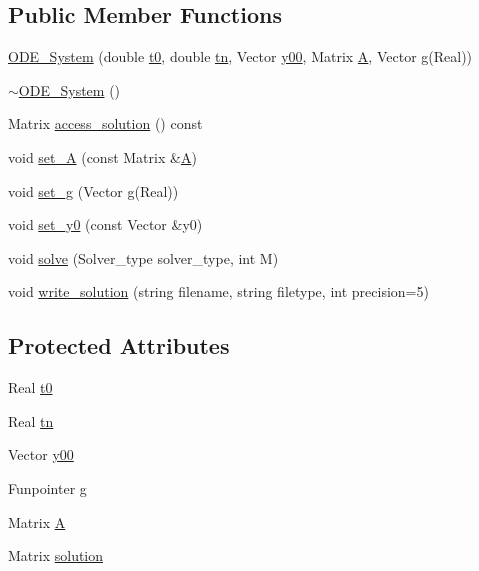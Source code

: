 \subsection*{Public Member Functions}
\begin{DoxyCompactItemize}
\item 
\mbox{\hyperlink{class_o_d_e___system_a38bd032b6faa0acc252c8c6c14a734b6}{O\+D\+E\+\_\+\+System}} (double \mbox{\hyperlink{class_o_d_e___system_a1947b357608babc98c5e79d645e24c3c}{t0}}, double \mbox{\hyperlink{class_o_d_e___system_a5c5a0dd9f04dfb8d8a84d49b741773af}{tn}}, Vector \mbox{\hyperlink{class_o_d_e___system_a1379137a4480e5861fd1911bc061f908}{y00}}, Matrix \mbox{\hyperlink{class_o_d_e___system_a632009677e80b62a1996e842398bf8b6}{A}}, Vector \mbox{\hyperlink{class_o_d_e___system_a2dee2a4b3468547c3ddab15edfc8ddfd}{g}}(Real))
\item 
\mbox{\hyperlink{class_o_d_e___system_a1d38890ff0950344d4d34b9fab6a956b}{$\sim$\+O\+D\+E\+\_\+\+System}} ()
\item 
Matrix \mbox{\hyperlink{class_o_d_e___system_aebb5a7971ef1c429077155eec549f713}{access\+\_\+solution}} () const
\item 
void \mbox{\hyperlink{class_o_d_e___system_a24094974423d600f580455427141fa3e}{set\+\_\+A}} (const Matrix \&\mbox{\hyperlink{class_o_d_e___system_a632009677e80b62a1996e842398bf8b6}{A}})
\item 
void \mbox{\hyperlink{class_o_d_e___system_a6906f9069496452cab2b56b6a49635d1}{set\+\_\+g}} (Vector \mbox{\hyperlink{class_o_d_e___system_a2dee2a4b3468547c3ddab15edfc8ddfd}{g}}(Real))
\item 
void \mbox{\hyperlink{class_o_d_e___system_a1856c9b15a41ca733e509e44f4535f5f}{set\+\_\+y0}} (const Vector \&y0)
\item 
void \mbox{\hyperlink{class_o_d_e___system_acb3bf3f43339cad39b4d0a5918dcf0eb}{solve}} (Solver\+\_\+type solver\+\_\+type, int M)
\item 
void \mbox{\hyperlink{class_o_d_e___system_a5220baf5d3f6df54b78bb1ef5079e170}{write\+\_\+solution}} (string filename, string filetype, int precision=5)
\end{DoxyCompactItemize}
\subsection*{Protected Attributes}
\begin{DoxyCompactItemize}
\item 
Real \mbox{\hyperlink{class_o_d_e___system_a1947b357608babc98c5e79d645e24c3c}{t0}}
\item 
Real \mbox{\hyperlink{class_o_d_e___system_a5c5a0dd9f04dfb8d8a84d49b741773af}{tn}}
\item 
Vector \mbox{\hyperlink{class_o_d_e___system_a1379137a4480e5861fd1911bc061f908}{y00}}
\item 
Funpointer \mbox{\hyperlink{class_o_d_e___system_a2dee2a4b3468547c3ddab15edfc8ddfd}{g}}
\item 
Matrix \mbox{\hyperlink{class_o_d_e___system_a632009677e80b62a1996e842398bf8b6}{A}}
\item 
Matrix \mbox{\hyperlink{class_o_d_e___system_ab2504680346a353e353f147f1ad9c51d}{solution}}
\end{DoxyCompactItemize}


